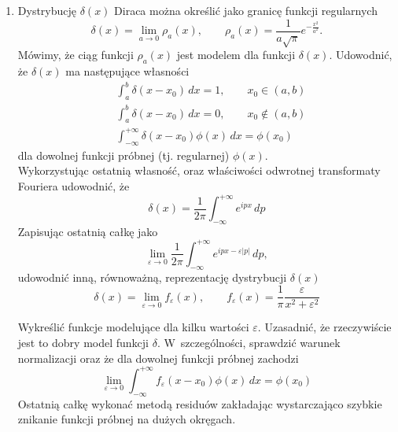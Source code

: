 \documentclass[a4paper,11pt]{article}
\begin{document}
\begin{enumerate}

\item Dystrybucję $\delta( x )$ Diraca można określić jako granicę
  funkcji regularnych
  \begin{equation}
    \label{QM:01}
    \delta( x ) = \lim_{ a \to 0 } \rho_{ a }( x ), \qquad
    \rho_{ a }( x ) =
    \frac{ 1 }{ a \sqrt{ \pi } } e^{ -\frac{ x^{ 2 } }{ a^{ 2 } } }.
  \end{equation}
  Mówimy, że ciąg funkcji $\rho_{ a }( x )$ jest modelem dla funkcji
  $\delta( x )$. Udowodnić, że $\delta( x )$ ma następujące własności
  \begin{align}
    &\int_{ a }^{ b } \delta( x - x_{ 0 } ) \, dx = 1, \qquad
      x_{ 0 } \in ( a, b ) \\
    &\int_{ a }^{ b } \delta( x - x_{ 0 } ) \, dx = 0, \qquad
      x_{ 0 } \notin ( a, b ) \\
    &\int_{ -\infty }^{ +\infty } \delta( x - x_{ 0 } ) \phi( x ) \, dx = \phi( x_{ 0 } )
  \end{align}
  dla dowolnej funkcji próbnej (tj. regularnej) $\phi( x )$. \\
  Wykorzystując ostatnią własność, oraz właściwości odwrotnej
  transformaty Fouriera udowodnić, że
  \begin{equation}
    \label{QM:02}
    \delta( x ) = \frac{ 1 }{ 2\pi } \int_{ -\infty }^{ +\infty } e^{ i p x } \, dp
  \end{equation}
  Zapisując ostatnią całkę jako
  \begin{equation}
    \label{QM:03}
    \lim_{ \varepsilon \to 0 } \frac{ 1 }{ 2\pi } \int_{ -\infty }^{ +\infty } e^{ ipx - \varepsilon | p | } \, dp,
  \end{equation}
  udowodnić inną, równoważną, reprezentację dystrybucji $\delta( x )$
  \begin{equation}
    \label{QM:04}
    \delta( x ) = \lim_{ \varepsilon \to 0 } f_{ \varepsilon }( x ), \qquad
    f_{ \varepsilon }( x ) = \frac{ 1 }{ \pi } \frac{ \varepsilon }{ x^{ 2 } + \varepsilon^{ 2 } }
  \end{equation}

  Wykreślić funkcje modelujące dla kilku wartości $\varepsilon$.
  Uzasadnić, że rzeczywiście jest to dobry model funkcji $\delta$.
  W~szczególności, sprawdzić warunek normalizacji oraz że dla dowolnej
  funkcji próbnej zachodzi
  \begin{equation}
    \label{QM:05}
    \lim_{ \varepsilon \to 0 } \int_{ -\infty }^{ +\infty } f_{ \varepsilon }( x - x_{ 0 } ) \phi( x ) \, dx
    =
    \phi( x_{ 0 } )
  \end{equation}
  Ostatnią całkę wykonać metodą residuów zakładając wystarczająco
  szybkie znikanie funkcji próbnej na dużych okręgach.


\end{enumerate}
\end{document}
